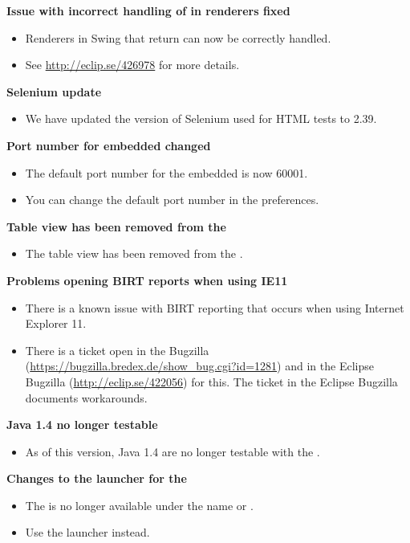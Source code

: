 \textbf{Issue with incorrect handling of  in renderers fixed}
\begin{itemize}
\item Renderers in Swing that return  can now be correctly handled.
\item See \url{http://eclip.se/426978} for more details. 
\end{itemize}

\textbf{Selenium update}
\begin{itemize}
\item We have updated the version of Selenium used for HTML tests to 2.39.
\end{itemize}

\textbf{Port number for embedded \gdagent{} changed}
\begin{itemize}
\item The default port number for the embedded \gdagent{} is now 60001.
\item You can change the default port number in the preferences.
\end{itemize}

\textbf{Table view has been removed from the \gdomeditor{}}
\begin{itemize}
\item The table view has been removed from the \gdomeditor{}.
\end{itemize}

\textbf{Problems opening BIRT reports when using IE11}
\begin{itemize}
\item There is a known issue with BIRT reporting that occurs when using Internet Explorer 11. 
\item There is a ticket open in the \gd{} Bugzilla (\url{https://bugzilla.bredex.de/show_bug.cgi?id=1281}) and in the Eclipse Bugzilla (\url{http://eclip.se/422056}) for this. The ticket in the Eclipse Bugzilla documents workarounds.
\end{itemize}

\textbf{Java 1.4 \gdauts{} no longer testable}
\begin{itemize}
\item As of this version, Java 1.4 \gdauts{} are no longer testable with the \ite{}. 
\end{itemize}

\textbf{Changes to the launcher for the \gdagent{}}
\begin{itemize}
\item The \gdagent{} is no longer available under the name  or .
\item Use the launcher  instead.
\end{itemize}

